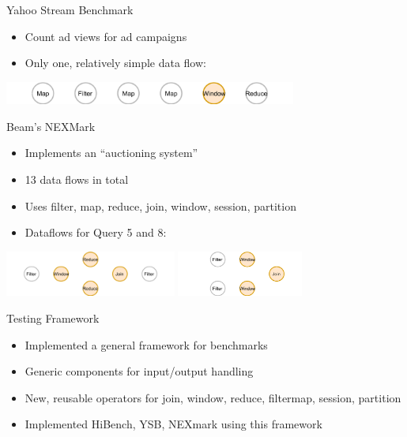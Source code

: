 \documentclass[14pt,t]{beamer}
\renewcommand{\title}[1]{
  {\LARGE #1} \vskip 0.4cm
}
\begin{document}
\begin{frame}
  \title{Yahoo Stream Benchmark\footnotemark}
  \begin{itemize}
  \item Count ad views for ad campaigns
  \item Only one, relatively simple data flow:
  \end{itemize}
  \includegraphics[height=0.75cm]{ysb.png}
\end{frame}

\begin{frame}
  \title{Beam's NEXMark\footnotemark}
  \begin{itemize}
  \item Implements an ``auctioning system''
  \item 13 data flows in total
  \item Uses filter, map, reduce, join, window, session, partition
  \item Dataflows for Query 5 and 8:
  \end{itemize}
  \includegraphics[height=1.5cm]{nex-5.png}
  \hfill
  \includegraphics[height=1.5cm]{nex-8.png}
\end{frame}

\begin{frame}
  \title{Testing Framework}
  \begin{itemize}
  \item Implemented a general framework for benchmarks
  \item Generic components for input/output handling
  \item New, reusable operators for join, window, reduce, filtermap, session, partition
  \item Implemented HiBench, YSB, NEXmark using this framework
  \end{itemize}
\end{frame}
\end{document}
